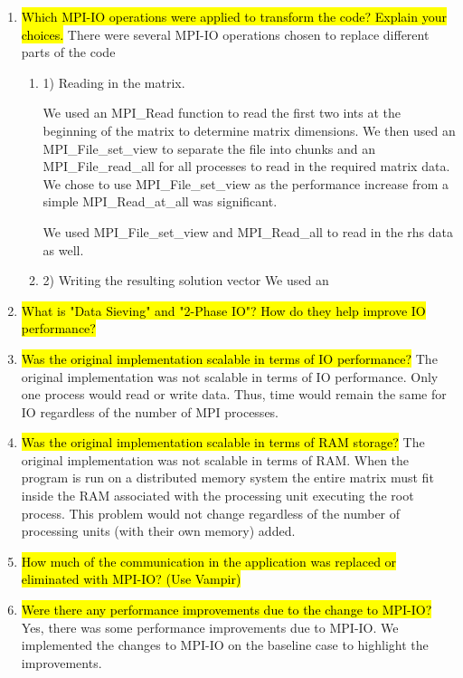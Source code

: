 \begin{enumerate}
  \item \hl{Which MPI-IO operations were applied to transform the code? Explain your choices.}
  There were several MPI-IO operations chosen to replace different parts of the code
  \begin{enumerate}
  \item 1) Reading in the matrix.
  
  We used an MPI_Read function to read the first two ints at the beginning of the matrix to determine matrix dimensions. We then used an MPI_File_set_view to separate the file into chunks and an MPI_File_read_all for all processes to read in the required matrix data. We chose to use MPI_File_set_view as the performance increase from a simple MPI_Read_at_all was significant.
  
  We used MPI_File_set_view and MPI_Read_all to read in the rhs data as well.
  
  \item 2) Writing the resulting solution vector
  We used an 
  
  \end{enumerate}
  
  \item \hl{What is "Data Sieving" and "2-Phase IO"? How do they help improve IO
performance?}

  \item \hl{Was the original implementation scalable in terms of IO performance?}
  The original implementation was not scalable in terms of IO performance. Only one process would read or write data. Thus, time would remain the same for IO regardless of the number of MPI processes.
  
  \item \hl{Was the original implementation scalable in terms of RAM storage?}
  The original implementation was not scalable in terms of RAM. When the program is run on a distributed memory system the entire matrix must fit inside the RAM associated with the processing unit executing the root process. This problem would not change regardless of the number of processing units (with their own memory) added.
  
  \item \hl{How much of the communication in the application was replaced or eliminated with MPI-IO? (Use
Vampir)}

  \item \hl{Were there any performance improvements due to the change to MPI-IO?}
  Yes, there was some performance improvements due to MPI-IO. We implemented the changes to MPI-IO on the baseline case to highlight the improvements.

\end{enumerate}

